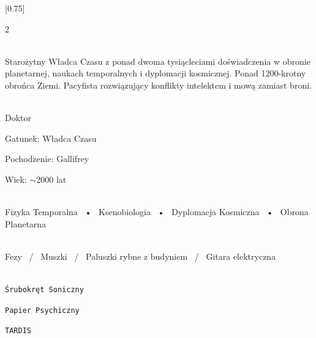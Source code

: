 \documentclass[lighthipster]{simplehipstercv}
\begin{document}
\setlength{\columnsep}{1.5cm}
[0.75]
\begin{paracol}{2}

\paracolbackgroundoptions

\footnotesize
{\setasidefontcolour
\flushright
\begin{center}
\end{center}

\\[0.5em]

{\footnotesize
Starożytny Władca Czasu z ponad dwoma tysiącleciami doświadczenia w obronie planetarnej, naukach temporalnych i dyplomacji kosmicznej. Ponad 1200-krotny obrońca Ziemi. Pacyfista rozwiązujący konflikty intelektem i mową zamiast broni.}
\bigskip

 \\[0.5em]
Doktor

Gatunek: Władca Czasu 

Pochodzenie: Gallifrey

Wiek: $\sim$2000 lat

\bigskip

 \\[0.5em]

Fizyka Temporalna ~•~ Ksenobiologia ~•~ Dyplomacja Kosmiczna ~•~ Obrona Planetarna

\bigskip

\\[0.5em]

Fezy ~/~ Muszki ~/~ Paluszki rybne z budyniem ~/~ Gitara elektryczna

\bigskip

\\[0.5em]

\texttt{Śrubokręt Soniczny}

\texttt{Papier Psychiczny} 

\texttt{TARDIS}

\vspace{4em}


\phantom{turn the page}

\phantom{turn the page}
}
\switchcolumn


\end{paracol}
\end{document}
